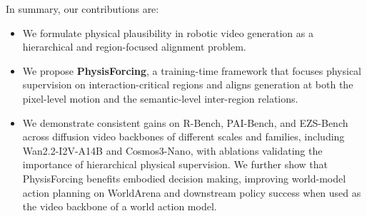 In summary, our contributions are:
\begin{itemize}
    \item We formulate physical plausibility in robotic video generation as a hierarchical and region-focused alignment problem.
    \item We propose \textbf{PhysisForcing}, a training-time framework that focuses physical supervision on interaction-critical regions and aligns generation at both the pixel-level motion and the semantic-level inter-region relations.
    
    \item We demonstrate consistent gains on R-Bench, PAI-Bench, and EZS-Bench across diffusion video backbones of different scales and families, including Wan2.2-I2V-A14B and Cosmos3-Nano, with ablations validating the importance of hierarchical physical supervision. We further show that PhysisForcing benefits embodied decision making, improving world-model action planning on WorldArena and downstream policy success when used as the video backbone of a world action model.
\end{itemize}